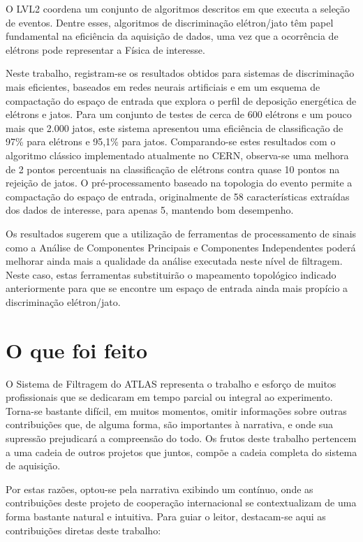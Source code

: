 O LVL2 coordena um conjunto de algoritmos descritos em  que
executa a seleção de eventos. Dentre esses, algoritmos de discriminação
elétron/jato têm papel fundamental na eficiência da aquisição de dados, uma
vez que a ocorrência de elétrons pode representar a Física de interesse.

Neste trabalho, registram-se os resultados obtidos para sistemas de
discriminação mais eficientes, baseados em redes neurais artificiais e em um
esquema de compactação do espaço de entrada que explora o perfil de deposição
energética de elétrons e jatos. Para um conjunto de testes de cerca de 600
elétrons e um pouco mais que 2.000 jatos, este sistema apresentou uma
eficiência de classificação de 97\% para elétrons e 95,1\% para
jatos. Comparando-se estes resultados com o algoritmo clássico implementado
atualmente no CERN, observa-se uma melhora de 2 pontos percentuais na
classificação de elétrons contra quase 10 pontos na rejeição de jatos. O
pré-processamento baseado na topologia do evento permite a compactação do
espaço de entrada, originalmente de 58 características extraídas dos dados de
interesse, para apenas 5, mantendo bom desempenho.

Os resultados sugerem que a utilização de ferramentas de processamento de
sinais como a Análise de Componentes Principais e Componentes Independentes
poderá melhorar ainda mais a qualidade da análise executada neste nível de
filtragem. Neste caso, estas ferramentas substituirão o mapeamento topológico
indicado anteriormente para que se encontre um espaço de entrada ainda mais
propício a discriminação elétron/jato.

\section{O que foi feito}

O Sistema de Filtragem do ATLAS representa o trabalho e esforço de muitos
profissionais que se dedicaram em tempo parcial ou integral ao
experimento. Torna-se bastante difícil, em muitos momentos, omitir informações
sobre outras contribuições que, de alguma forma, são importantes à narrativa,
e onde sua supressão prejudicará a compreensão do todo. Os frutos deste
trabalho pertencem a uma cadeia de outros projetos que juntos, compõe a cadeia
completa do sistema de aquisição.

Por estas razões, optou-se pela narrativa exibindo um contínuo, onde as
contribuições deste projeto de cooperação internacional se contextualizam de
uma forma bastante natural e intuitiva. Para guiar o leitor, destacam-se aqui
as contribuições diretas deste trabalho:

